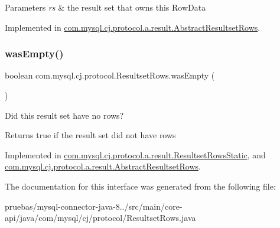 \begin{DoxyParams}{Parameters}
{\em rs} & the result set that \textquotesingle{}owns\textquotesingle{} this Row\+Data \\
\hline
\end{DoxyParams}


Implemented in \mbox{\hyperlink{classcom_1_1mysql_1_1cj_1_1protocol_1_1a_1_1result_1_1_abstract_resultset_rows_aa020316d48045e8ade0aaeddf40d1de6}{com.\+mysql.\+cj.\+protocol.\+a.\+result.\+Abstract\+Resultset\+Rows}}.

\mbox{\label{interfacecom_1_1mysql_1_1cj_1_1protocol_1_1_resultset_rows_a46258b5b85f7536a54d62054403e6cf8}} 
\subsubsection{\texorpdfstring{was\+Empty()}{wasEmpty()}}
{\footnotesize\ttfamily boolean com.\+mysql.\+cj.\+protocol.\+Resultset\+Rows.\+was\+Empty (\begin{DoxyParamCaption}{ }\end{DoxyParamCaption})}

Did this result set have no rows?

\begin{DoxyReturn}{Returns}
true if the result set did not have rows 
\end{DoxyReturn}


Implemented in \mbox{\hyperlink{classcom_1_1mysql_1_1cj_1_1protocol_1_1a_1_1result_1_1_resultset_rows_static_ad18792e2f43667c3dc0b6e41a6de3026}{com.\+mysql.\+cj.\+protocol.\+a.\+result.\+Resultset\+Rows\+Static}}, and \mbox{\hyperlink{classcom_1_1mysql_1_1cj_1_1protocol_1_1a_1_1result_1_1_abstract_resultset_rows_ae97f8b33948868aab21df7320f9f91f4}{com.\+mysql.\+cj.\+protocol.\+a.\+result.\+Abstract\+Resultset\+Rows}}.



The documentation for this interface was generated from the following file\+:\begin{DoxyCompactItemize}
\item 
pruebas/mysql-\/connector-\/java-\/8../src/main/core-\/api/java/com/mysql/cj/protocol/Resultset\+Rows.\+java\end{DoxyCompactItemize}
